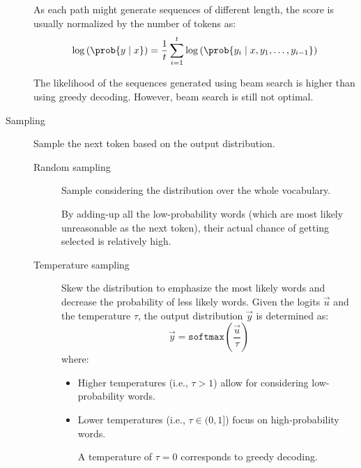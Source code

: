 \begin{description}
        \begin{remark}
            As each path might generate sequences of different length, the score is usually normalized by the number of tokens as:
            \[ \log\left( \prob{y \mid x} \right) = \frac{1}{t} \sum_{i=1}^{t} \log\left( \prob{ y_i \mid x, y_1, \dots, y_{i-1} } \right) \]
        \end{remark}

        \begin{remark}
            The likelihood of the sequences generated using beam search is higher than using greedy decoding. However, beam search is still not optimal.
        \end{remark}

    \item[Sampling] 
        Sample the next token based on the output distribution.

        \begin{description}
            \item[Random sampling]
                Sample considering the distribution over the whole vocabulary.

                \begin{remark}
                    By adding-up all the low-probability words (which are most likely unreasonable as the next token), their actual chance of getting selected is relatively high.
                \end{remark}

            \item[Temperature sampling]
                Skew the distribution to emphasize the most likely words and decrease the probability of less likely words. Given the logits $\vec{u}$ and the temperature $\tau$, the output distribution $\vec{y}$ is determined as:
                \[ \vec{y} = \texttt{softmax}\left( \frac{\vec{u}}{\tau} \right) \]
                where:
                \begin{itemize}
                    \item Higher temperatures (i.e., $\tau > 1$) allow for considering low-probability words.
                    \item Lower temperatures (i.e., $\tau \in (0, 1]$) focus on high-probability words.
                    \begin{remark}
                        A temperature of $\tau = 0$ corresponds to greedy decoding.
                    \end{remark}
                \end{itemize}



\end{description}
\end{description}
